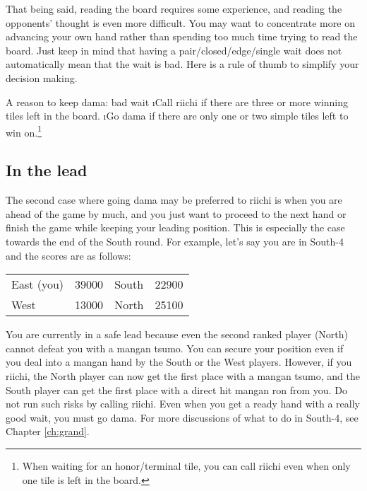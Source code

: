 \bigskip
That being said, reading the board requires some experience, and reading the opponents' thought is even more difficult. You may want to concentrate more on advancing your own hand rather than spending too much time trying to read the board. Just keep in mind that having a pair/closed/edge/single wait does not automatically mean that the wait is bad. Here is a rule of thumb to simplify your decision making.

\bigskip
\begin{itembox}[c]{A reason to keep {\jap dama}: bad wait}
\bi
\i Call riichi if there are three or more winning tiles left in the board.
\i Go {\jap dama} if there are only one or two simple tiles left to win on.\footnote{When waiting for an honor/terminal tile, you can call riichi even when only one tile is left in the board.}
\ei \vsps
\end{itembox}

\bigskip
\subsection{In the lead}\label{sec:lead}
The second case where going {\jap dama} may be preferred to riichi is when you are ahead of the game by much, and you just want to proceed to the next hand or finish the game while keeping your leading position. This is especially the case towards the end of the South round. For example, let's say you are in South-4 and the scores are as follows:

\begin{center}
\begin{tabular}{l r l r}
East (you) & 39000 & South & 22900\\
West & 13000 & North & 25100\\
\end{tabular}
\end{center}

You are currently in a safe lead because even the second ranked \linebreak player (North) cannot defeat you with a {\jap mangan tsumo}. You can secure your position even if you deal into a {\jap mangan} hand by the South or the West players. However, if you riichi, the North player can now get the first place with a {\jap mangan tsumo}, and the South player can get the first place with a direct hit {\jap mangan ron} from you. Do not run such risks by calling riichi. Even when you get a ready hand with a really good wait, you must go {\jap dama}. For more discussions of what to do in South-4, see Chapter \ref{ch:grand}.

